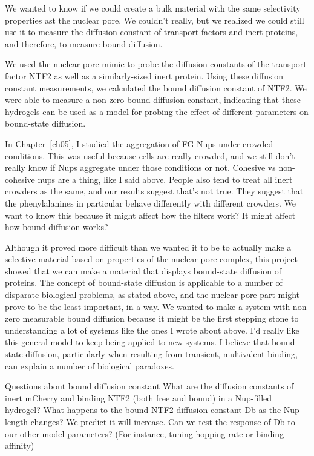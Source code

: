We wanted to know if we could create a bulk material with the same selectivity properties ast the nuclear pore.  We couldn't really, but we realized we could still use it to measure the diffusion constant of transport factors and inert proteins, and therefore, to measure bound diffusion.

We used the nuclear pore mimic to probe the diffusion constants of the transport factor NTF2 as well as a similarly-sized inert protein.  Using these diffusion constant measurements, we calculated the bound diffusion constant of NTF2.  We were able to measure a non-zero bound diffusion constant, indicating that these hydrogels can be used as a model for probing the effect of different parameters on bound-state diffusion.

In Chapter~\ref{ch05}, I studied the aggregation of FG Nups under crowded conditions.  This was useful because cells are really crowded, and we still don't really know if Nups aggregate under those conditions or not.  Cohesive vs non-cohesive nups are a thing, like I said above.  People also tend to treat all inert crowders as the same, and our results suggest that's not true.  They suggest that the phenylalanines in particular behave differently with different crowders.  We want to know this because it might affect how the filters work?  It might affect how bound diffusion works?

Although it proved more difficult than we wanted it to be to actually make a selective material based on properties of the nuclear pore complex, this project showed that we can make a material that displays bound-state diffusion of proteins.  The concept of bound-state diffusion is applicable to a number of disparate biological problems, as stated above, and the nuclear-pore part might prove to be the least important, in a way.  We wanted to make a system with non-zero measurable bound diffusion because it might be the first stepping stone to understanding a lot of systems like the ones I wrote about above. I'd really like this general model to keep being applied to new systems. I believe that bound-state diffusion, particularly when resulting from transient, multivalent binding, can explain a number of biological paradoxes.

Questions about bound diffusion constant
What are the diffusion constants of inert mCherry and binding NTF2 (both free and bound) in a Nup-filled hydrogel?
What happens to the bound NTF2 diffusion constant Db  as the Nup length changes? We predict it will increase.
Can we test the response of Db to our other model parameters? (For instance, tuning hopping rate or binding affinity)

